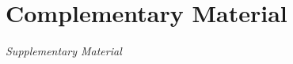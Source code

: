 \documentclass[beamer,handout,10pt]{standalone}
\begin{document}

\section{Complementary Material}
\begin{frame}
	\begin{center}
	\Huge\emph{Supplementary Material}
	\end{center}
\end{frame}
\note[itemize]{
	\item
}
\addtocounter{framenumber}{-1}
\end{document}
